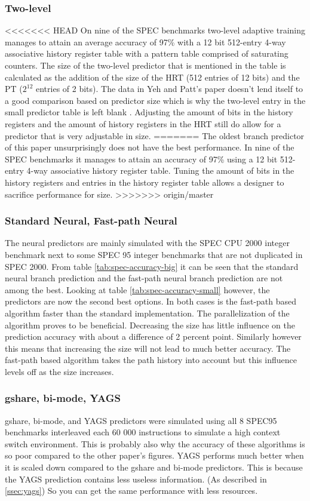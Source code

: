 \subsubsection*{Two-level}
<<<<<<< HEAD
On nine of the SPEC benchmarks two-level adaptive training manages to attain an average accuracy of 97\% with a 12 bit 512-entry 4-way associative history register table with a pattern table comprised of saturating counters. 
The size of the two-level predictor that is mentioned in the table is calculated as the addition of the size of the HRT (512 entries of 12 bits) and the PT ($2^12$ entries of 2 bits). 
The data in Yeh and Patt's paper doesn't lend itself to a good comparison based on predictor size which is why the two-level entry in the small predictor table is left blank \cite{twolevel}. 
Adjusting the amount of bits in the history registers and the amount of history registers in the HRT still do allow for a predictor that is very adjustable in size.
=======
The oldest branch predictor of this paper unsurprisingly does not have the best performance.
In nine of the SPEC benchmarks it manages to attain an accuracy of 97\% using a 12 bit 512-entry 4-way associative history register table. Tuning the amount of bits in the history registers and entries in the history register table allows a designer to sacrifice performance for size.
>>>>>>> origin/master

\subsubsection*{Standard Neural, Fast-path Neural}
The neural predictors are mainly simulated with the SPEC CPU 2000 integer benchmark next to some SPEC 95 integer benchmarks that are not duplicated in SPEC 2000. From table \ref{tab:spec-accuracy-big} it can be seen that the standard neural branch prediction and the fast-path neural branch prediction are not among the best. Looking at table \ref{tab:spec-accuracy-small} however, the predictors are now the second best options. In both cases is the fast-path based algorithm faster than the standard implementation. The parallelization of the algorithm proves to be beneficial. Decreasing the size has little influence on the prediction accuracy with about a difference of 2 percent point. Similarly however this means that increasing the size will not lead to much better accuracy. The fast-path based algorithm takes the path history into account but this influence levels off as the size increases.

\subsubsection*{gshare, bi-mode, YAGS}
gshare, bi-mode, and YAGS predictors were simulated using all 8 SPEC95 benchmarks interleaved each 60 000 instructions to simulate a high context switch environment.
This is probably also why the accuracy of these algorithms is so poor compared to the other paper's figures.
YAGS performs much better when it is scaled down compared to the gshare and bi-mode predictors.
This is because the YAGS prediction contains less useless information. (As described in \ref{ssec:yags})
So you can get the same performance with less resources.
